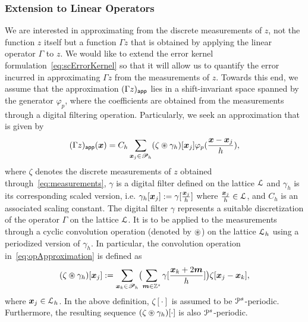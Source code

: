 \subsubsection{Extension to Linear Operators}
We are interested in approximating from the discrete measurements
of $z$, not the function $z$ itself but a function $\Gamma z$ that is obtained
by applying the linear operator $\Gamma$ to $z$. 
We would like to
extend the error kernel formulation~\eqref{eq:scErrorKernel} so that it will
allow us to quantify the error incurred in approximating $\Gamma z$ from the
measurements of $z$. Towards this end, we assume that the approximation
$(\Gamma z)_{\mathsf{app}}$ lies in a shift-invariant space spanned by the generator
$\varphi_p$, where the coefficients are obtained from the measurements through a
digital filtering operation. Particularly, we seek an approximation that is
given by
\begin{equation}
\appf{(\Gamma z)}(\vect{x}) = C_h \sum_{\vect{x}_j \in \pointset{P}_h} 
(\zeta \pconv \gamma_h)[\vect{x}_j]
\varphi_p(\frac{\vect{x}-\vect{x}_j}{h}),
\label{eq:opApproximation}
\end{equation}
where $\zeta$ denotes the discrete measurements of $z$ obtained
through~\eqref{eq:measurements}, $\gamma$ is a digital filter defined on
the lattice $\mathcal{L}$ and $\gamma_h$ is its corresponding scaled
version, i.e. $\gamma_h[\boldsymbol{x}_j] := \gamma[\tfrac{\boldsymbol{x}_j}{h}]$ where
$\tfrac{\boldsymbol{x}_j}{h} \in \mathcal{L}$, and $C_h$ is an associated
scaling constant. The digital filter $\gamma$ represents a suitable
discretization of the operator $\Gamma$ on the lattice $\mathcal{L}$. It is
to be applied to the measurements through a cyclic convolution
operation (denoted by $\circledast$) on the lattice $\mathcal{L}_h$ using a
periodized version of $\gamma_h$. In particular, the convolution operation
in~\eqref{eq:opApproximation} is defined as
\begin{equation}
  (\zeta \pconv \gamma_h)[\vect{x}_j] :=
  \sum_{\vect{x}_k \in \pointset{P}_h}
  \bigl(
    \sum_{\vect{m} \in \ints^s}\gamma[\frac{\vect{x}_k + 2\vect{m}}{h}]
  \bigr)
  \zeta[\vect{x}_j - \vect{x}_k],
\label{eq:cyclicConvolution}
\end{equation}
where $\boldsymbol{x}_j \in \mathcal{L}_h$. In the above definition,
$\zeta[\cdot]$ is assumed to be $\mathcal{P}^s$-periodic.  Furthermore, the
resulting sequence $(\zeta \circledast \gamma_h)[\cdot]$ is also
$\mathcal{P}^s$-periodic.

